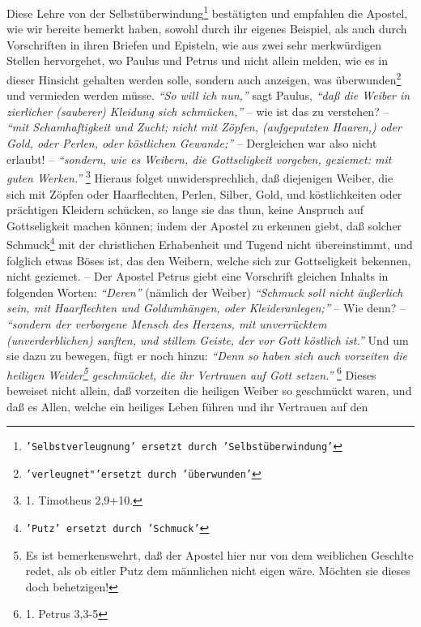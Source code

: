 Diese Lehre von der Selbstüberwindung\footnote{\texttt{'Selbstverleugnung' ersetzt durch 'Selbstüberwindung'}} bestätigten und empfahlen die Apostel, wie
wir bereite bemerkt haben, sowohl durch ihr eigenes Beispiel, als auch durch
Vorschriften in ihren Briefen und Episteln, wie aus zwei sehr merkwürdigen
Stellen hervorgehet, wo Paulus und Petrus und nicht allein melden, wie es in
dieser Hinsicht gehalten werden solle, sondern auch anzeigen, was überwunden\footnote{\texttt{'verleugnet"'ersetzt durch 'überwunden'}} und
vermieden werden müsse. \textit{"`So will ich nun,"'} sagt Paulus,
\textit{"`daß die Weiber in
zierlicher (sauberer) Kleidung sich schmücken,"'} -- wie ist das zu verstehen? --
\textit{"`mit Schamhaftigkeit und Zucht; nicht mit Zöpfen, (aufgeputzten Haaren,) oder
Gold, oder Perlen, oder köstlichen Gewande;"'} -- Dergleichen war also nicht
erlaubt! -- \textit{"`sondern, wie es Weibern, die Gottseligkeit vorgeben, geziemet: mit
guten Werken."'}
\footnote{1. Timotheus 2,9+10.}
Hieraus folget unwidersprechlich, daß
diejenigen Weiber, die sich mit Zöpfen oder Haarflechten, Perlen, Silber, Gold,
und köstlichkeiten oder prächtigen Kleidern schücken, so lange sie das thun,
keine Anspruch auf Gottseligkeit machen können; indem der Apostel zu erkennen
giebt, daß solcher Schmuck\footnote{\texttt{'Putz' ersetzt durch 'Schmuck'}} mit der christlichen Erhabenheit und Tugend nicht
übereinstimmt, und folglich etwas Böses ist, das den Weibern, welche sich zur
Gottseligkeit bekennen, nicht geziemet. -- Der Apostel Petrus giebt eine
Vorschrift gleichen Inhalts in folgenden Worten: \textit{"`Deren"'} (nämlich der Weiber)
\textit{"`Schmuck soll nicht äußerlich sein, mit Haarflechten und Goldumhängen, oder
Kleideranlegen;"'} -- Wie denn? --
\textit{"`sondern der verborgene Mensch des Herzens,
mit unverrücktem (unverderblichen) sanften, und stillem Geiste, der vor Gott
köstlich ist."'} Und um sie dazu zu bewegen, fügt er noch hinzu:
\textit{"`Denn so haben
sich auch vorzeiten die heiligen Weider\footnote{Es ist bemerkenswehrt, daß der
Apostel hier nur von dem weiblichen Geschlte redet, als ob eitler Putz dem
männlichen nicht eigen wäre. Möchten sie dieses doch behetzigen!} geschmücket,
die ihr Vertrauen auf Gott setzen."'}
\footnote{1. Petrus 3,3-5}
Dieses
beweiset nicht allein, daß vorzeiten die heiligen Weiber so geschmückt waren,
und daß es Allen, welche ein heiliges Leben führen und ihr Vertrauen auf den
